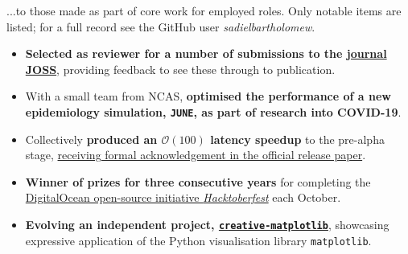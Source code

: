 \documentclass[10pt,a4paper]{cv_template}
\begin{document}
\begin{paracol}{2}

...to those made as part of core work for employed roles. Only notable items are listed; for a full record see the GitHub user \textit{sadielbartholomew}.

\vspace{1em}

\begin{itemize}
  \item \textbf{Selected as reviewer for a number of submissions to the \href{https://joss.theoj.org/}{journal JOSS}}, providing feedback to see these through to publication.
\end{itemize}

\divider

\begin{itemize}
  \item With a small team from NCAS, \textbf{optimised the performance of a new epidemiology simulation, \texttt{JUNE}, as part of research into COVID-19}.
  \item Collectively \textbf{produced an $\mathcal{O}(100)$ latency speedup} to the pre-alpha stage, \href{https://doi.org/10.1101/2020.12.15.20248246}{receiving formal acknowledgement in the official release paper}.
\end{itemize}

\divider

\begin{itemize}
  \item \textbf{Winner of prizes for three consecutive years} for completing the \href{https://hacktoberfest.digitalocean.com/}{DigitalOcean open-source initiative  \textit{Hacktoberfest}} each October.
\end{itemize}

\divider

\begin{itemize}
  \item \textbf{Evolving an independent project, \href{https://github.com/sadielbartholomew/creative-matplotlib}{\texttt{creative-matplotlib}}}, showcasing expressive application of the Python visualisation library \texttt{matplotlib}.
\end{itemize}



\end{paracol}
\end{document}
